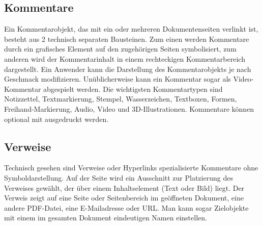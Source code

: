 \subsection{Kommentare}
Ein Kommentarobjekt, das mit ein oder mehreren Dokumentenseiten verlinkt ist, besteht aus 2 technisch separaten Bausteinen. Zum einen werden Kommentare durch ein grafisches Element auf den zugehörigen Seiten symbolisiert, zum anderen wird der Kommentarinhalt in einem rechteckigen Kommentarbereich dargestellt. Ein Anwender kann die Darstellung des Kommentarobjekts je nach Geschmack modifizieren. Unüblicherweise kann ein Kommentar sogar als Video-Kommentar abgespielt werden. Die wichtigsten Kommentartypen sind Notizzettel, Textmarkierung, Stempel, Wasserzeichen, Textboxen, Formen, Freihand-Markierung, Audio, Video und 3D-Illustrationen. Kommentare können optional mit ausgedruckt werden. \cite{softx}

\subsection{Verweise}
Technisch gesehen sind Verweise oder Hyperlinks spezialisierte Kommentare ohne Symboldarstellung. Auf der Seite wird ein Ausschnitt zur Platzierung des Verweises gewählt, der über einem Inhaltselement (Text oder Bild) liegt. Der Verweis zeigt auf eine Seite oder Seitenbereich im geöffneten Dokument, eine andere PDF-Datei, eine E-Mailadresse oder URL. Man kann sogar Zielobjekte mit einem im gesamten Dokument eindeutigen Namen einstellen. \cite{softx}

